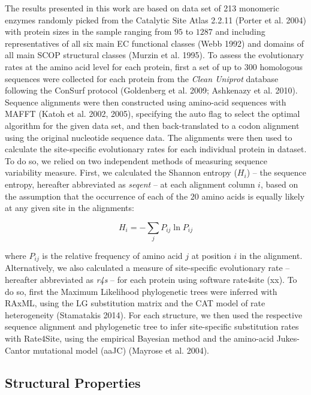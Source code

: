 \documentclass[11pt]{article}
\begin{document}
    The results presented in this work are based on data set of 213 monomeric enzymes randomly picked from the Catalytic Site Atlas 2.2.11 (Porter et al. 2004) with protein sizes in the sample ranging from $95$ to $1287$ and including representatives of all six main EC functional classes (Webb 1992) and domains of all main SCOP structural classes (Murzin et al. 1995). To assess the evolutionary rates at the amino acid level for each protein, first a set of up to $300$ homologous sequences were collected for each protein from the {\it Clean Uniprot} database following the ConSurf protocol (Goldenberg et al. 2009; Ashkenazy et al. 2010). Sequence alignments were then constructed using amino-acid sequences with MAFFT (Katoh et al. 2002, 2005), specifying the auto flag to select the optimal algorithm for the given data set, and then back-translated to a codon alignment using the original nucleotide sequence data. The alignments were then used to calculate the site-specific evolutionary rates for each individual protein in dataset. To do so, we relied on two independent methods of measuring sequence variability measure. First, we calculated the Shannon entropy ($H_i$) -- the sequence entropy, hereafter abbreviated as {\it seqent} -- at each alignment column $i$, based on the assumption that the occurrence of each of the $20$ amino acids is equally likely at any given site in the alignments:

    \begin{equation}
        \label{eqn:shannon}
        H_i = -\sum_j P_{ij}\ln P_{ij}
    \end{equation}

    where $P_{ij}$ is the relative frequency of amino acid $j$ at position $i$ in the alignment. Alternatively, we also calculated a measure of site-specific evolutionary rate -- hereafter abbreviated as {\it r4s} -- for each protein using software rate4site (xx). To do so, first the Maximum Likelihood phylogenetic trees were inferred with RAxML, using the LG substitution matrix and the CAT model of rate heterogeneity (Stamatakis 2014). For each structure, we then used the respective sequence alignment and phylogenetic tree to infer site-specific substitution rates with Rate4Site, using the empirical Bayesian method and the amino-acid Jukes-Cantor mutational model (aaJC) (Mayrose et al. 2004).

    \subsection*{Structural Properties}
\end{document}
